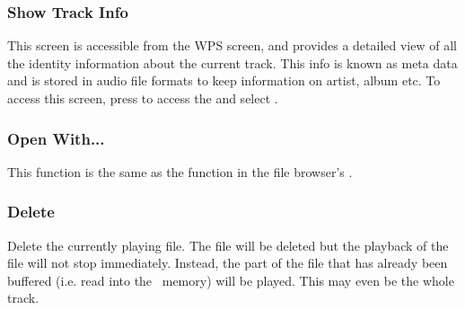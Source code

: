 \subsubsection{\label{ref:trackinfoviewer}Show Track Info}
This screen is accessible from the WPS screen, and provides a detailed view of
all the identity information about the current track. This info is known as
meta data and is stored in audio file formats to keep information on artist,
album etc. To access this screen, %
%
%
      {press \ActionWpsContext{} to access the
       and select . }

\subsubsection{Open With...}
This  function is the same as the 
function in the file browser's .

\subsubsection{Delete}
Delete the currently playing file. The file will be deleted but the playback
of the file will not stop immediately. Instead, the part of the file that
has already been buffered (i.e. read into the \daps\ memory) will be played.
This may even be the whole track.

